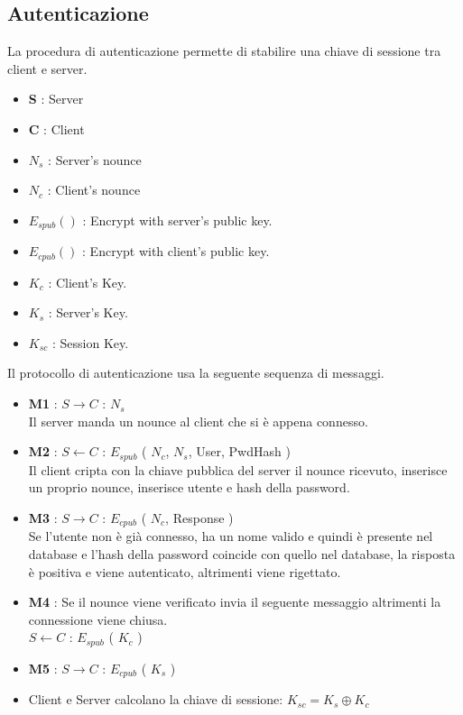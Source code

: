 \documentclass[a4paper,titlepage]{article}
\begin{document}
\subsection{Autenticazione}
La procedura di autenticazione permette di stabilire una chiave di sessione tra client e server.
\begin{itemize}
\item \textbf{S} : Server
\item \textbf{C} : Client
\item $N_s$ : Server's nounce
\item $N_c$ : Client's nounce
\item $E_{spub} ()$ : Encrypt with server's public key. 
\item $E_{cpub} ()$ : Encrypt with client's public key.
\item $K_c$ : Client's Key.
\item $K_s$ : Server's Key.
\item $K_{sc}$ : Session Key.
\end{itemize}
Il protocollo di autenticazione usa la seguente sequenza di messaggi.
\begin{itemize}
\item \textbf{M1} : $S \rightarrow C$ : $N_s$ \\
Il server manda un nounce al client che si è appena connesso.
\item \textbf{M2} : $S \leftarrow C$ : $E_{spub}$ ( $N_c$, $N_s$, User, PwdHash )\\
Il client cripta con la chiave pubblica del server il nounce ricevuto, inserisce un proprio nounce, inserisce utente e hash della password.
\item \textbf{M3} : $S \rightarrow C$ : $E_{cpub}$ ( $N_c$, Response )\\
Se l'utente non è già connesso, ha un nome valido e quindi è presente nel database e l'hash della password coincide con quello nel database, la risposta è positiva e viene autenticato, altrimenti viene rigettato.
\item \textbf{M4} : Se il nounce viene verificato invia il seguente messaggio altrimenti la connessione viene chiusa.\\
$S \leftarrow C$ : $E_{spub}$ ( $K_c$ )
\item \textbf{M5} : $S \rightarrow C$ : $E_{cpub}$ ( $K_s$ )
\item Client e Server calcolano la chiave di sessione: $ K_{sc} = K_s \oplus K_c $
\end{itemize}
\end{document}
